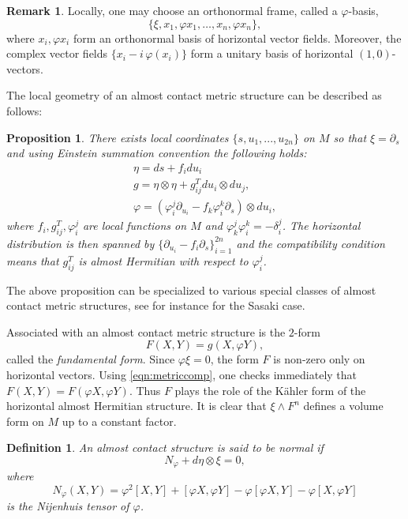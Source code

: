 \documentclass{article}
\newtheorem{prop}[thm]{Proposition}
\newtheorem{defn}[thm]{Definition}
\theoremstyle{definition}
\newtheorem{rmk}[thm]{Remark}
\renewcommand{\phi}{\varphi}
\numberwithin{equation}{section}
\begin{document}
\begin{rmk}
Locally, one may choose an orthonormal frame, called a \(\phi\)-basis,
\[
\{\xi, x_1, \phi x_1, \dots, x_n, \phi x_n\},
\]
where \(x_i,  \phi x_i\) form an orthonormal basis of horizontal vector fields.  
Moreover, the complex vector fields \(\{x_i - i\,\phi(x_i)\}\) form a unitary basis of horizontal \((1,0)\)-vectors.
\end{rmk}
The local geometry of an almost contact metric structure can be described as follows: 
\begin{prop}\label{prop: local model}
    There exists local coordinates $\{s,u_1,...,u_{2n}\}$ on $M$ so that $\xi=\partial_s$ and using Einstein summation convention the following holds:
    \begin{gather*}
        \eta = ds+ f_idu_i\\
        g=\eta\otimes \eta+g^T_{ij}du_i\otimes du_j,\\
        \varphi=(\varphi^{j}_i\partial_{u_i}-f_k\varphi^{k}_i\partial_s)\otimes du_i,
    \end{gather*}
where $f_i,g_{ij}^T, \varphi_i^j$ are local functions on $M$ and $\varphi_k^j\varphi_i^k=-\delta_i^j$. The horizontal distribution is then spanned by $\{\partial_{u_i}-f_i\partial_s\}_{i=1}^{2n}$ and the compatibility condition means that $g^T_{ij}$ is almost Hermitian with respect to $\varphi^j_i$. 
\end{prop}
The above proposition can be specialized to various special classes of almost contact metric structures, see for instance \cite{Pawel2000} for the Sasaki case.

Associated with an almost contact metric structure is the \(2\)-form
\begin{equation}\label{def of F}
F(X,Y) = g(X, \phi Y),    
\end{equation}
called the \emph{fundamental form}.
Since \(\phi\xi = 0\), the form \(F\) is non-zero only on horizontal vectors.
Using \eqref{eqn:metriccomp}, one checks immediately that \(F(X,Y) = F(\phi X, \phi Y)\).
Thus \(F\) plays the role of the Kähler form of the horizontal almost Hermitian structure.
It is clear that \(\xi \wedge F^n\) defines a volume form on \(M\) up to a constant factor.

\medskip

\begin{defn}
An almost contact structure is said to be \emph{normal} if
\[
N_\phi + d\eta \otimes \xi = 0,
\]
where 
\[
N_\phi(X,Y) = \phi^2[X,Y] + [\phi X, \phi Y] - \phi[\phi X, Y] - \phi[X, \phi Y]
\]
is the Nijenhuis tensor of \(\phi\).
\end{defn}
\end{document}
